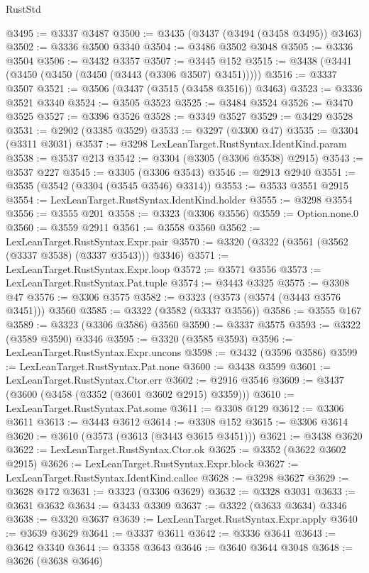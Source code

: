 \begin{lexlean}{RustStd}
\begin{coremodule}
@3495 := @3337 @3487
@3500 := @3435 (@3437 (@3494 (@3458 @3495)) @3463)
@3502 := @3336 @3500 @3340
@3504 := @3486 @3502 @3048
@3505 := @3336 @3504
@3506 := @3432 @3357
@3507 := @3445 @152
@3515 := @3438 (@3441 (@3450 (@3450 (@3450 (@3443 (@3306 @3507) @3451)))))
@3516 := @3337 @3507
@3521 := @3506 (@3437 (@3515 (@3458 @3516)) @3463)
@3523 := @3336 @3521 @3340
@3524 := @3505 @3523
@3525 := @3484 @3524
@3526 := @3470 @3525
@3527 := @3396 @3526
@3528 := @3349 @3527
@3529 := @3429 @3528
@3531 := @2902 (@3385 @3529)
@3533 := @3297 (@3300 @47)
@3535 := @3304 (@3311 @3031)
@3537 := @3298 LexLeanTarget.RustSyntax.IdentKind.param
@3538 := @3537 @213
@3542 := @3304 (@3305 (@3306 @3538) @2915)
@3543 := @3537 @227
@3545 := @3305 (@3306 @3543)
@3546 := @2913 @2940
@3551 := @3535 (@3542 (@3304 (@3545 @3546) @3314))
@3553 := @3533 @3551 @2915
@3554 := LexLeanTarget.RustSyntax.IdentKind.holder
@3555 := @3298 @3554
@3556 := @3555 @201
@3558 := @3323 (@3306 @3556)
@3559 := Option.none.{0}
@3560 := @3559 @2911
@3561 := @3558 @3560
@3562 := LexLeanTarget.RustSyntax.Expr.pair
@3570 := @3320 (@3322 (@3561 (@3562 (@3337 @3538) (@3337 @3543))) @3346)
@3571 := LexLeanTarget.RustSyntax.Expr.loop
@3572 := @3571 @3556
@3573 := LexLeanTarget.RustSyntax.Pat.tuple
@3574 := @3443 @3325
@3575 := @3308 @47
@3576 := @3306 @3575
@3582 := @3323 (@3573 (@3574 (@3443 @3576 @3451))) @3560
@3585 := @3322 (@3582 (@3337 @3556))
@3586 := @3555 @167
@3589 := @3323 (@3306 @3586) @3560
@3590 := @3337 @3575
@3593 := @3322 (@3589 @3590) @3346
@3595 := @3320 (@3585 @3593)
@3596 := LexLeanTarget.RustSyntax.Expr.uncons
@3598 := @3432 (@3596 @3586)
@3599 := LexLeanTarget.RustSyntax.Pat.none
@3600 := @3438 @3599
@3601 := LexLeanTarget.RustSyntax.Ctor.err
@3602 := @2916 @3546
@3609 := @3437 (@3600 (@3458 (@3352 (@3601 @3602 @2915) @3359)))
@3610 := LexLeanTarget.RustSyntax.Pat.some
@3611 := @3308 @129
@3612 := @3306 @3611
@3613 := @3443 @3612
@3614 := @3308 @152
@3615 := @3306 @3614
@3620 := @3610 (@3573 (@3613 (@3443 @3615 @3451)))
@3621 := @3438 @3620
@3622 := LexLeanTarget.RustSyntax.Ctor.ok
@3625 := @3352 (@3622 @3602 @2915)
@3626 := LexLeanTarget.RustSyntax.Expr.block
@3627 := LexLeanTarget.RustSyntax.IdentKind.callee
@3628 := @3298 @3627
@3629 := @3628 @172
@3631 := @3323 (@3306 @3629)
@3632 := @3328 @3031
@3633 := @3631 @3632
@3634 := @3433 @3309
@3637 := @3322 (@3633 @3634) @3346
@3638 := @3320 @3637
@3639 := LexLeanTarget.RustSyntax.Expr.apply
@3640 := @3639 @3629
@3641 := @3337 @3611
@3642 := @3336 @3641
@3643 := @3642 @3340
@3644 := @3358 @3643
@3646 := @3640 @3644 @3048
@3648 := @3626 (@3638 @3646)

\end{coremodule}
\end{lexlean}

